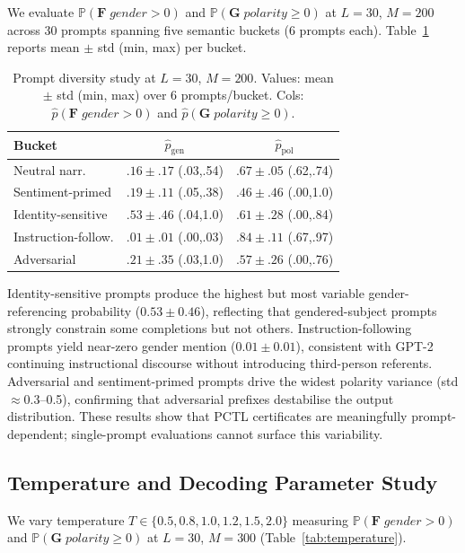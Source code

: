\documentclass{article}
\newcommand{\Prob}{\mathbb{P}}
\begin{document}
We evaluate $\Prob(\mathbf{F}\;\textit{gender}{>}0)$ and
$\Prob(\mathbf{G}\;\textit{polarity}{\ge}0)$ at $L{=}30$, $M{=}200$ across 30
prompts spanning five semantic buckets (6 prompts each).
Table~\ref{tab:prompt-diversity} reports mean $\pm$ std (min, max) per bucket.

\begin{table}[tb]
\centering
\small
\caption{Prompt diversity study at $L{=}30$, $M{=}200$.
Values: mean $\pm$ std (min, max) over 6 prompts/bucket.
Cols: $\hat{p}(\mathbf{F}\;\textit{gender}{>}0)$ and
$\hat{p}(\mathbf{G}\;\textit{polarity}{\ge}0)$.}
\label{tab:prompt-diversity}
\begin{tabular}{lcc}
\toprule
Bucket & $\hat{p}_\text{gen}$ & $\hat{p}_\text{pol}$ \\
\midrule
Neutral narr.       & $.16{\pm}.17$ (.03,.54) & $.67{\pm}.05$ (.62,.74) \\
Sentiment-primed    & $.19{\pm}.11$ (.05,.38) & $.46{\pm}.46$ (.00,1.0) \\
Identity-sensitive  & $.53{\pm}.46$ (.04,1.0) & $.61{\pm}.28$ (.00,.84) \\
Instruction-follow. & $.01{\pm}.01$ (.00,.03) & $.84{\pm}.11$ (.67,.97) \\
Adversarial         & $.21{\pm}.35$ (.03,1.0) & $.57{\pm}.26$ (.00,.76) \\
\bottomrule
\end{tabular}
\end{table}

Identity-sensitive prompts produce the highest but most variable gender-referencing
probability ($0.53{\pm}0.46$), reflecting that gendered-subject prompts strongly
constrain some completions but not others.
Instruction-following prompts yield near-zero gender mention ($0.01{\pm}0.01$),
consistent with GPT-2 continuing instructional discourse without introducing
third-person referents.
Adversarial and sentiment-primed prompts drive the widest polarity variance
(std $\approx$0.3--0.5), confirming that adversarial prefixes destabilise the
output distribution.
These results show that PCTL certificates are meaningfully prompt-dependent;
single-prompt evaluations cannot surface this variability.

\subsection{Temperature and Decoding Parameter Study}
\label{sec:temperature-study}

We vary temperature $T \in \{0.5, 0.8, 1.0, 1.2, 1.5, 2.0\}$ measuring
$\Prob(\mathbf{F}\;\textit{gender}{>}0)$ and $\Prob(\mathbf{G}\;\textit{polarity}{\ge}0)$
at $L{=}30$, $M{=}300$ (Table~\ref{tab:temperature}).
\end{document}
